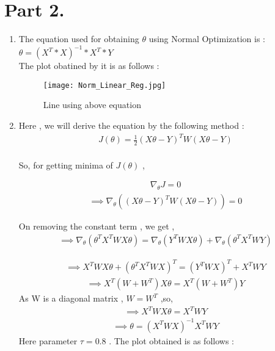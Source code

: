 \documentclass{article}
\begin{document}
\section{Part 2.}
\begin{enumerate}[label=(\alph*)]
    \item The equation used for obtaining $\theta$ using Normal Optimization is : \\
                    $\theta = (X^T * X)^{-1}*X^T * Y$ \\
                    The plot obatined by it is as follows :
        \begin{figure}[H]
            \centering
            \texttt{[image: Norm\_Linear\_Reg.jpg]}
            \caption{Line using above equation}
            \label{Linear_Reg_Cont_13}
         \end{figure}
                    
                    
    \item Here , we will derive the equation by the following method :\\
    \begin{align*} 
           J(\theta) = \frac{1}{2} (X\theta - Y)^TW(X\theta - Y)
    \end{align*}\\
    So, for getting minima of $J(\theta)$ , 
    
    \begin{align*} 
        \nabla_ \theta J = 0
     \end{align*}
    \begin{align*} 
           \implies \nabla_ \theta   ((X\theta - Y)^TW(X\theta - Y)) =0
    \end{align*}
    
    On removing the constant term , we get ,
    \begin{align*} 
           \implies \nabla_\theta (\theta ^T X^T W X \theta) = \nabla_\theta (Y^TWX\theta)  + \nabla_\theta (\theta ^T X^TWY) 
    \end{align*}    
    
    \begin{align*} 
           \implies X^TWX\theta + (\theta ^TX^TWX)^T = (Y^TWX)^T + X^TWY
    \end{align*} 
    \begin{align*}
           \implies X^T(W + W^T)X\theta = X^T(W+W^T)Y
    \end{align*}  
    As W is a diagonal matrix , $W = W^T$ ,so, 
    \begin{align*}
           \implies X^TWX\theta = X^TWY
    \end{align*}
    \begin{align*}
           \implies \theta = (X^TWX)^{-1}X^TWY
    \end{align*}  
    Here parameter $\tau = 0.8$ .
    The plot obtained is as follows :\\
    

\end{enumerate}
\end{document}
